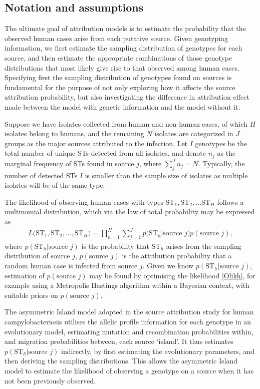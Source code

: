 \documentclass[times, doublespace]{WileyNJD-v2}%
\begin{document}
\subsection{Notation and assumptions}
The ultimate goal of attribution models is to estimate the probability that the observed human cases arise from each putative source. Given genotyping information, we first estimate the sampling distribution of genotypes for each source, and then estimate the appropriate combinations of those genotype distributions that most likely give rise to that observed among human cases. Specifying first the sampling distribution of genotypes found on sources is fundamental for the purpose of not only exploring how it affects the source attribution probability, but also investigating the difference in attribution effect made between the model with genetic information and the model without it.

Suppose we have isolates collected from human and non-human cases, of which $H$ isolates belong to humans, and the remaining $N$ isolates are categorized in $J$ groups as the major sources attributed to the infection. Let $I$ genotypes be the total number of unique STs detected from all isolates, and denote $n_j$ as the marginal frequency of STs found in source $j$, where $\sum_j^J n_j = N$. Typically, the number of detected STs $I$ is smaller than the sample size of isolates as multiple isolates will be of the same type.

The likelihood of observing human cases with types $\text{ST}_1, \text{ST}_2, \ldots \text{ST}_H$ follows a multinomial distribution, which via the law of total probability may be expressed as
\begin{align}
  L\Big(\text{ST}_1, \text{ST}_2, \ldots, \text{ST}_H\Big)=\prod_{h=1}^{H}\sum_{j=1}^{J} p\Big(\text{ST}_h \vert \text{source } j\Big) p(\text{source }j),
  \label{Olikh}
\end{align}
where $p(\text{ST}_h \vert \text{source }j)$ is the probability that $\text{ST}_h$ arises from the sampling distribution of source $j$, $p(\text{source }j)$ is the attribution probability that a random human case is infected from source $j$. Given we know $p(\text{ST}_h \vert \text{source }j)$, estimation of $p(\text{source }j)$ may be found by optimising the likelihood \ref{Olikh}, for example using a Metropolis Hastings algorithm within a Bayesian context, with suitable priors on $p(\text{source }j)$.

The asymmetric Island model \cite{Wilso} adopted in the source attribution study for human campylobacteriosis \cite{Marsh} utilises the allelic profile information for each genotype in an evolutionary model, estimating mutation and recombination probabilities within, and migration probabilities between, each source `island'. It thus estimates $p(\text{ST}_h \vert \text{source }j)$ indirectly, by first estimating the evolutionary parameters, and then deriving the sampling distributions. This allows the asymmetric Island model to estimate the likelihood of observing a genotype on a source when it has not been previously observed.
\end{document}
